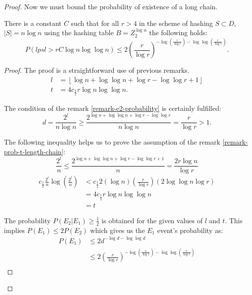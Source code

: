 \begin{proof}
Now we must bound the probability of existence of a long chain.
\begin{remark}
There is a constant $C$ such that for all $r > 4$ in the scheme of hashing $S \subset D$, $|S| = n \log n$ using the hashing table $B = Z_2^{\log n}$ the following holds:
\begin{displaymath}
P(lpsl > rC \log n \log \log n) \leq 2 \left(\frac{r}{\log r}\right)^{-\log \left(\frac{r}{\log r}\right) - \log \log \left(\frac{r}{\log r}\right)}\textit{.}
\end{displaymath}
\end{remark}
\begin{proof}
The proof is a straightforward use of previous remarks.
\begin{displaymath}
\begin{split}
l & = \left\lfloor \log n + \log \log n + \log r - \log \log r + 1 \right\rfloor \\
t & = 4c_{\frac{1}{2}}r\log n \log \log n \textit{.}
\end{split}
\end{displaymath}

The condition of the remark \ref{remark-e2-probability} is certainly fulfilled:
\begin{displaymath}
d = \frac{2^l}{n \log n} \geq \frac{2^{\log n + \log \log n + \log r - \log \log r}}{n \log n} = \frac{r}{\log r} > 1\textit{.}
\end{displaymath}

The following inequality helps us to prove the assumption of the remark \ref{remark-prob-t-length-chain}:
\begin{displaymath}
\frac{2^l}{n} \leq \frac{2 ^{\log n + \log \log n + \log r - \log \log r + 1}}{n} = \frac{2 r\log n}{\log r}
\end{displaymath}
\begin{displaymath}
\begin{split}
c_{\frac{1}{2}}\frac{2^l}{n}\log\left(\frac{2^l}{n}\right)
	& < c_{\frac{1}{2}} 2 \left(\log n\right) \left(\frac{r}{\log r}\right)\left(2\log\log n \log r\right) \\
	& = 4 c_{\frac{1}{2}} r \log n \log \log n \\
	& = t
\end{split}
\end{displaymath}

The probability $P(E_2 | E_1) \geq \frac{1}{2}$ is obtained for the given values of $l$ and $t$. This implies $P(E_1) \leq 2 P(E_2)$ which gives us the $E_1$ event's probability as:
\begin{displaymath}
\begin{split}
P(E_1) 
	& \leq 2d^{-\log d - \log \log d} \\
	& \leq 2\left(\frac{r}{\log r}\right)^{-\log \left(\frac{r}{\log r}\right) - \log \log \left(\frac{r}{\log r}\right)} \\
\end{split}
\end{displaymath}


\end{proof}
\end{proof}
